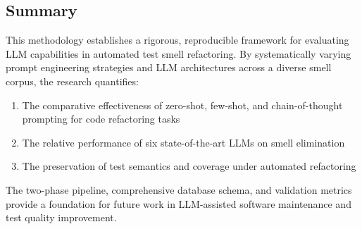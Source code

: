\documentclass[12pt]{article}
\begin{document}
\subsection{Summary}

This methodology establishes a rigorous, reproducible framework for evaluating LLM capabilities in automated test smell refactoring. By systematically varying prompt engineering strategies and LLM architectures across a diverse smell corpus, the research quantifies:
\begin{enumerate}
    \item The comparative effectiveness of zero-shot, few-shot, and chain-of-thought prompting for code refactoring tasks
    \item The relative performance of six state-of-the-art LLMs on smell elimination
    \item The preservation of test semantics and coverage under automated refactoring
\end{enumerate}

The two-phase pipeline, comprehensive database schema, and validation metrics provide a foundation for future work in LLM-assisted software maintenance and test quality improvement.
\end{document}
